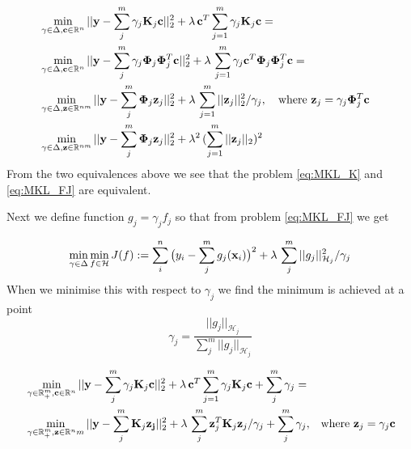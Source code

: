 \begin{eqnarray}
& \min_{\gamma \in \Delta, \mathbf{c} \in \mathbb{R}^n} 
||\mathbf{y} - \sum_{j}^m \gamma_j \mathbf{K}_j \mathbf{c}||_2^2 +
\lambda \, \mathbf{c}^T \sum_{j=1}^m \gamma_j \mathbf{K}_j \mathbf{c} = & \nonumber \\
& \min_{\gamma \in \Delta, \mathbf{c} \in \mathbb{R}^n} 
||\mathbf{y} - \sum_{j}^m \gamma_j \mathbf{\Phi}_j \mathbf{\Phi}_j^T \mathbf{c}||_2^2 +
\lambda \, \sum_{j=1}^m \gamma_j \mathbf{c}^T \mathbf{\Phi}_j \mathbf{\Phi}_j^T \mathbf{c} = & \nonumber \\
& \min_{\gamma \in \Delta, \mathbf{z} \in \mathbb{R}^{nm}} 
||\mathbf{y} - \sum_{j}^m \mathbf{\Phi}_j \mathbf{z}_j||_2^2 +
\lambda \, \sum_{j=1}^m || \mathbf{z}_j ||_2^2/ \gamma_j, \quad \text{where } \mathbf{z}_j = \gamma_j \mathbf{\Phi}_j^T \mathbf{c} & \nonumber \\
& \min_{\gamma \in \Delta, \mathbf{z} \in \mathbb{R}^{nm}} 
||\mathbf{y} - \sum_{j}^m \mathbf{\Phi}_j \mathbf{z}_j||_2^2 +
\lambda^2 \, (\sum_{j=1}^m || \mathbf{z}_j ||_2 )^2 &
\end{eqnarray}
From the two equivalences above we see that the problem \eqref{eq:MKL_K} and \eqref{eq:MKL_FJ} are equivalent.

Next we define function $g_j = \gamma_j f_j$ so that from problem \eqref{eq:MKL_FJ} we get

\begin{equation}\label{eq:MKL_GJ}
 \min_{\gamma \in \Delta} \min_{f \in \mathcal{H}} J(f) := \sum_i^n \big( y_i - \sum_j^m g_j(\mathbf{x}_i) \big)^2 + \lambda \, \sum_j^m ||g_j||^2_{\mathcal{H}_j} / \gamma_j 
\end{equation}
When we minimise this with respect to $\gamma_j$ we find the minimum is achieved at a point 
\begin{equation}
\gamma_j = \frac{||g_j||_{\mathcal{H}_j}}{\sum_j^m ||g_j||_{\mathcal{H}_j}}
\end{equation}


\begin{eqnarray}\label{eq:SingleLearningProblemMKL5}
& \min_{\gamma \in \mathbb{R}^m_+, \mathbf{c} \in \mathbb{R}^n} 
||\mathbf{y} - \sum_{j}^m \gamma_j \mathbf{K}_j \mathbf{c}||_2^2 +
\lambda \, \mathbf{c}^T \sum_{j=1}^m \gamma_j \mathbf{K}_j \mathbf{c} + \sum_{j}^m \gamma_j = & \nonumber \\
& \min_{\gamma \in \mathbb{R}^m_+, \mathbf{z} \in \mathbb{R}^nm} 
||\mathbf{y} - \sum_{j}^m \mathbf{K}_j \mathbf{z_j}||_2^2 +
\lambda \, \sum_{j}^m \mathbf{z}_j^T \mathbf{K}_j \mathbf{z}_j/\gamma_j + \sum_{j}^m \gamma_j, & \text{where } \mathbf{z}_j = \gamma_j \mathbf{c}
\end{eqnarray}

